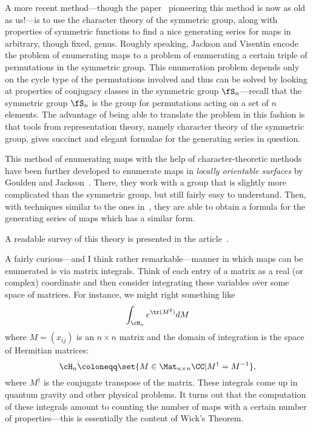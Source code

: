 \documentclass{axolotl}
\begin{document}
A more recent method---though the paper~\cite{JV} pioneering this method is now
as old as us!---is to use the character theory of the symmetric group, along
with properties of symmetric functions to find a nice generating series for
maps in arbitrary, though fixed, genus. Roughly speaking, Jackson and Visentin
encode the problem of enumerating maps to a problem of enumerating a certain
triple of permutations in the symmetric group. This enumeration problem depends
only on the cycle type of the permutations involved and thus can be solved by
looking at properties of conjugacy classes in the symmetric group
\(\fS_n\)---recall that the symmetric group \(\fS_n\) is the group for
permutations acting on a set of \(n\) elements. The advantage of being able
to translate the problem in this fashion is that tools from representation
theory, namely character theory of the symmetric group, gives succinct and
elegant formulae for the generating series in question.

This method of enumerating maps with the help of character-theoretic methods
have been further developed to enumerate maps in \emph{locally orientable
  surfaces} by Goulden and Jackson~\cite{GJ1}. There, they work with a group
that is slightly more complicated than the symmetric group, but still fairly
easy to understand. Then, with techniques similar to the ones in~\cite{JV},
they are able to obtain a formula for the generating series of maps which has
a similar form.

A readable survey of this theory is presented in the article~\cite{GJ2}.

A fairly curious---and I think rather remarkable---manner in which maps can
be enumerated is via matrix integrals. Think of each entry of a matrix as a
real (or complex) coordinate and then consider integrating these variables over
some space of matrices. For instance, we might right something like
\[ \int_{\cH_n} e^{\tr(M^2)} dM \]
where \(M = (x_{ij})\) is an \(n \times n\) matrix and the domain of integration
is the space of Hermitian matrices:
\[ \cH_n \coloneqq \set{M \in \Mat_{n \times n}\CC | M^\dagger = M^{-1}}, \]
where \(M^\dagger\) is the conjugate transpose of the matrix. These integrals
come up in quantum gravity and other physical problems. It turns out that the
computation of these integrals amount to counting the number of maps with a
certain number of properties---this is essentially the content of Wick's Theorem.
\end{document}
